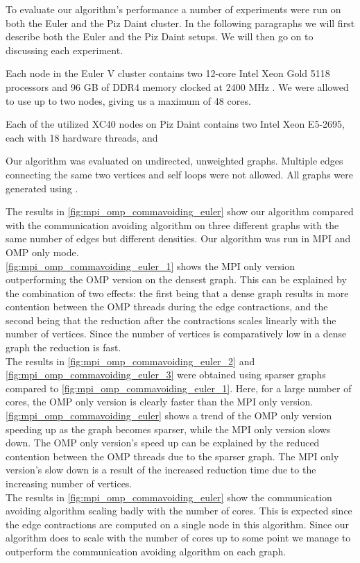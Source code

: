 To evaluate our algorithm's performance a number of experiments were run on both the Euler and the
Piz Daint cluster. In the following paragraphs we will first describe both the Euler and the Piz
Daint setups. We will then go on to discussing each experiment.

Each node in the Euler V cluster contains two 12-core Intel Xeon Gold 5118 processors and 96 GB of
DDR4 memory clocked at 2400 MHz \cite{Euler}. We were allowed to use up to two nodes, giving us a
maximum of 48 cores.

Each of the utilized XC40 nodes on Piz Daint contains two Intel Xeon E5-2695, each with 18 hardware threads,
and

Our algorithm was evaluated on undirected, unweighted graphs. Multiple edges connecting the same
two vertices and self loops were not allowed. All graphs were generated using \cite{Parmat}.

The results in \autoref{fig:mpi_omp_commavoiding_euler} show our algorithm compared with the
communication avoiding algorithm \cite{comm_avoiding} on three different graphs with the same
number of edges but different densities. Our algorithm was run in MPI and OMP only mode.\\
\autoref{fig:mpi_omp_commavoiding_euler_1} shows the MPI only version outperforming the OMP version on the densest graph. This can be explained by the combination of two effects:
the first being that a dense graph results in more contention between the OMP threads during the
edge contractions, and the second being that the reduction after the contractions scales linearly
with the number of vertices. Since the number of vertices is comparatively low in a dense graph the
reduction is fast.\\
The results in \autoref{fig:mpi_omp_commavoiding_euler_2} and
\autoref{fig:mpi_omp_commavoiding_euler_3} were obtained using sparser graphs compared to
\autoref{fig:mpi_omp_commavoiding_euler_1}. Here, for a large number of cores, the OMP only version
is clearly faster than the MPI only version. \autoref{fig:mpi_omp_commavoiding_euler} shows a trend
of the OMP only version speeding up as the graph becomes sparser, while the MPI only version slows
down. The OMP only version's speed up can be explained by the reduced contention between the OMP
threads due to the sparser graph. The MPI only version's slow down is a result of the increased
reduction time due to the increasing number of vertices.\\
The results in \autoref{fig:mpi_omp_commavoiding_euler} show the communication avoiding algorithm
scaling badly with the number of cores. This is expected since the edge contractions are computed
on a single node in this algorithm. Since our algorithm does to scale with the number of cores up
to some point we manage to outperform the communication avoiding algorithm on each graph.

